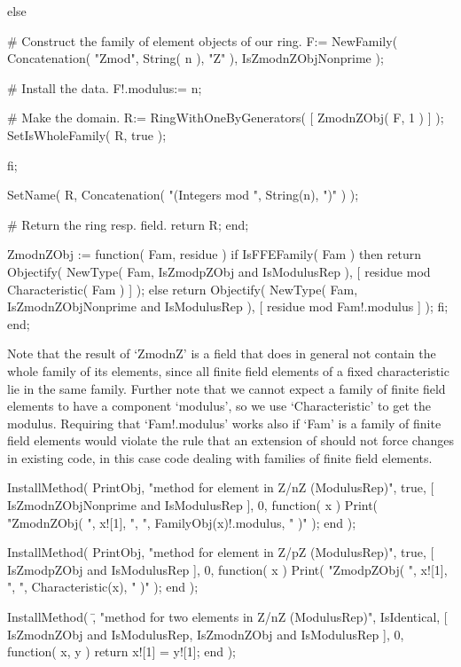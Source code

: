         else

          # Construct the family of element objects of our ring.
          F:= NewFamily( Concatenation( "Zmod", String( n ), "Z" ),
                         IsZmodnZObjNonprime );
  
          # Install the data.
          F!.modulus:= n;
  
          # Make the domain.
          R:= RingWithOneByGenerators( [ ZmodnZObj( F, 1 ) ] );
          SetIsWholeFamily( R, true );

        fi;

        SetName( R, Concatenation( "(Integers mod ", String(n), ")" ) );

        # Return the ring resp. field.
        return R;
    end;


    ZmodnZObj := function( Fam, residue )
    if IsFFEFamily( Fam ) then
      return Objectify( NewType( Fam,     IsZmodpZObj
                                      and IsModulusRep ),
                        [ residue mod Characteristic( Fam ) ] );
    else
      return Objectify( NewType( Fam,     IsZmodnZObjNonprime
                                      and IsModulusRep ),
                        [ residue mod Fam!.modulus ] );
    fi;
    end;
\endexample

Note that the result of `ZmodnZ' is a field that does in general not
contain the whole family of its elements, since all finite field
elements of a fixed characteristic lie in the same family.
Further note that we cannot expect a family of finite field elements
to have a component `modulus',
so we use `Characteristic' to get the modulus.
Requiring that `Fam!.modulus' works also if `Fam' is a family of
finite field elements would violate the rule
that an extension of {\GAP} should not force changes in existing code,
in this case code dealing with families of finite field elements.

\beginexample
    InstallMethod( PrintObj,
        "method for element in Z/nZ (ModulusRep)",
        true,
        [ IsZmodnZObjNonprime and IsModulusRep ], 0,
        function( x )
        Print( "ZmodnZObj( ", x![1], ", ", FamilyObj(x)!.modulus, " )" );
        end );

    InstallMethod( PrintObj,
        "method for element in Z/pZ (ModulusRep)",
        true,
        [ IsZmodpZObj and IsModulusRep ], 0,
        function( x )
        Print( "ZmodpZObj( ", x![1], ", ", Characteristic(x), " )" );
        end );

    InstallMethod( \=,
        "method for two elements in Z/nZ (ModulusRep)",
        IsIdentical,
        [ IsZmodnZObj and IsModulusRep,
          IsZmodnZObj and IsModulusRep ], 0,
        function( x, y ) return x![1] = y![1]; end );
\endexample

